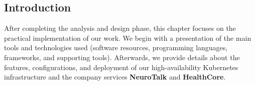 \documentclass[a4paper,12pt]{report}
\begin{document}
\fancyhead[R]{\nouppercase{\rightmark}}
\begin{doublespace}
 \section*{Introduction}
\hspace{1cm}After completing the analysis and design phase, this chapter focuses on the practical implementation of our work. 
 We begin with a presentation of the main tools and technologies used (software resources, programming languages, frameworks, and supporting tools). 
 Afterwards, we provide details about the features, configurations, and deployment of our high-availability Kubernetes infrastructure and the company services 
 \textbf{NeuroTalk} and \textbf{HealthCore}.
\end{doublespace}
\end{document}
